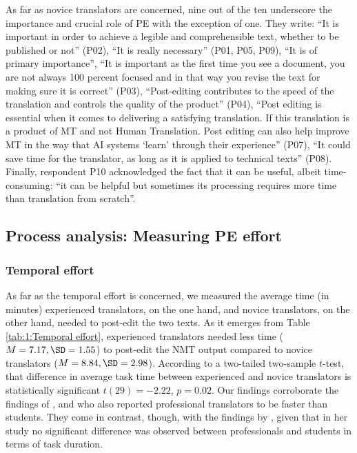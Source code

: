 \documentclass[output=paper]{langscibook}
\begin{document}
As far as novice translators are concerned, nine out of the ten underscore the importance and crucial role of PE with the exception of one. They write: “It is important in order to achieve a legible and comprehensible text, whether to be published or not” (P02), “It is really necessary” (P01, P05, P09), “It is of primary importance”, “It is important as the first time you see a document, you are not always 100 percent focused and in that way you revise the text for making sure it is correct” (P03), “Post-editing contributes to the speed of the translation and controls the quality of the product” (P04), “Post editing is essential when it comes to delivering a satisfying translation. If this translation is a product of MT and not Human Translation. Post editing can also help improve MT in the way that AI systems ‘learn’ through their experience” (P07), “It could save time for the translator, as long as it is applied to technical texts” (P08). Finally, respondent P10 acknowledged the fact that it can be useful, albeit time-consuming: “it can be helpful but sometimes its processing requires more time than translation from scratch”. 

\subsection{Process analysis: Measuring PE effort}

\subsubsection{Temporal effort}
As far as the temporal effort is concerned, we measured the average time (in minutes) experienced translators, on the one hand, and novice translators, on the other hand, needed to post-edit the two texts. As it emerges from Table \ref{tab:1:Temporal effort}, experienced translators needed less time ($M = 7.17, \SD = 1.55$) to post-edit the NMT output compared to novice translators ($M = 8.84, \SD = 2.98$). According to a two-tailed two-sample $t$-test, that difference in average task time between experienced and novice translators is statistically significant $t(29) = -2.22$, $p = 0.02$. Our findings corroborate the findings of \citet{CarlBuch-Kromann2010}, \citet{moorkens-obrien-2015-post} and \citet{SchaefferHansen-Schirra2019} who also reported professional translators to be faster than students. They come in contrast, though, with the findings by \citet{nitzke2019problem}, given that in her study no significant difference was observed between professionals and students in terms of task duration.
\end{document}
